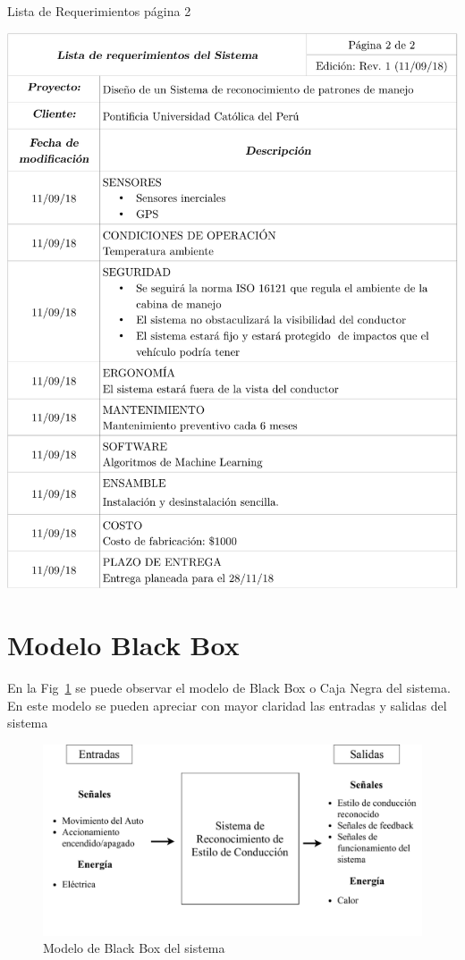 \begin{table}[htbp!]
  \caption{Lista de Requerimientos página 2}
  \label{diag:2.2}
  \includegraphics[width=1.05\linewidth]{Tab2.pdf}
\end{table}

\section{Modelo Black Box}
En la Fig~\ref{fig:3.1} se puede observar el modelo de Black Box o Caja Negra del sistema. En este modelo se pueden apreciar con mayor claridad las entradas y salidas del sistema

\begin{figure}[htbp!]
\centering
\includegraphics[width=\textwidth]{Fig1.pdf}
\caption{Modelo de Black Box del sistema}
\label{fig:3.1}
\end{figure}


